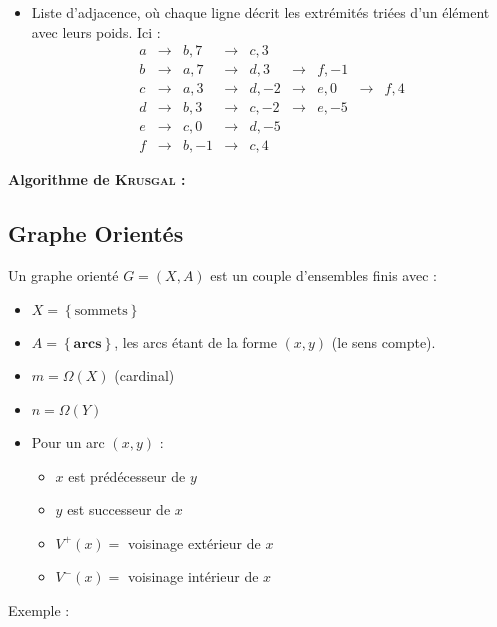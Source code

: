 \documentclass[a4paper, 8pt]{article}
\begin{document}
\begin{multicols*}{3}
\begin{itemize}
	\item Liste d'adjacence, où chaque ligne décrit les extrémités triées d'un élément avec leurs poids. Ici :
	\[\begin{smallmatrix}
	 a & \longrightarrow & b,7 & \longrightarrow & c,3 &  & &  &  \\ 
	 b & \longrightarrow & a,7 & \longrightarrow & d,3 & \longrightarrow & f,-1 &  &  \\ 
	 c & \longrightarrow & a,3 & \longrightarrow & d,-2 & \longrightarrow & e,0 & \longrightarrow & f,4 \\ 
	 d & \longrightarrow & b,3 & \longrightarrow & c,-2 & \longrightarrow & e,-5 &  &  \\ 
	 e & \longrightarrow & c,0 & \longrightarrow & d,-5 &  &  &  &  \\ 
	 f & \longrightarrow & b,-1 & \longrightarrow & c,4 &  &  &  & 
	 \end{smallmatrix}  \]
\end{itemize}
\textbf{Algorithme de \textsc{Krusgal} :}

\subsection*{Graphe Orientés}
Un graphe orienté $G = (X,A)$ est un couple d'ensembles finis avec :
\begin{itemize}
\item $X = \left\{\text{sommets}\right\}$
\item $A = \left\{\mathbf{arcs}\right\}$, les arcs étant de la forme $(x,y)$ (le sens compte).
\item $m = \Omega(X)$ (cardinal)
\item $n = \Omega(Y)$
\item Pour un arc $(x,y)$ :
	\begin{itemize}
	\item $x$ est prédécesseur de $y$
	\item $y$ est successeur de $x$
	\item $V^+(x) =$ voisinage extérieur de $x$
	\item $V^-(x) =$ voisinage intérieur de $x$
	\end{itemize}
\end{itemize}
\medskip
Exemple :
\begin{center}
\end{center}
\end{multicols*}
\end{document}

